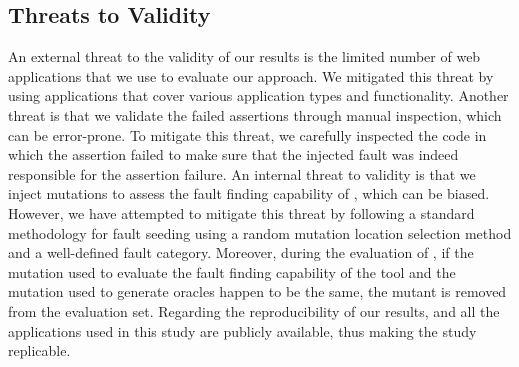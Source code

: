 \subsection{Threats to Validity} \label{threatsToValidity}
An external threat to the validity of our results is the limited number of web applications that we use to evaluate our approach. 
We mitigated this threat by using \javascript applications that cover various application types and functionality.
Another threat is that we validate the failed assertions through manual inspection,  which can be error-prone. To mitigate this threat, we carefully inspected the code in which the assertion failed to make sure that the injected fault was indeed responsible for the assertion failure.
An internal threat to validity is that we inject mutations to assess the fault finding capability of \tool, which can be biased. However, we have attempted  to mitigate this threat by following a standard methodology for fault seeding using a random mutation location selection method and a well-defined fault category. Moreover, during the evaluation of \tool, if the mutation used to evaluate the fault finding capability of the tool and the mutation used to generate oracles happen to be the same, the mutant is removed from the evaluation set.     
Regarding the reproducibility of our results, \tool and all the applications used in this study are publicly available, thus making the study replicable.
